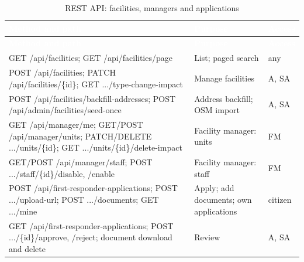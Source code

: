 {\tabfont\rowband
\begin{longtable}{@{}>{\raggedright\arraybackslash}p{}>{\raggedright\arraybackslash}p{}>{\raggedright\arraybackslash}p{}@{}}
\caption{REST API: facilities, managers and applications}\label{tab:api-5}\\
\rowcolor{najdanavy}\textcolor{white}{\sffamily\bfseries\small Method and path} & \textcolor{white}{\sffamily\bfseries\small Purpose} & \textcolor{white}{\sffamily\bfseries\small Access}\\
\endfirsthead
\rowcolor{najdanavy}\textcolor{white}{\sffamily\bfseries\small Method and path} & \textcolor{white}{\sffamily\bfseries\small Purpose} & \textcolor{white}{\sffamily\bfseries\small Access}\\
\endhead
\bottomrule\endlastfoot
GET /\allowbreak{}api/\allowbreak{}facilities; GET /\allowbreak{}api/\allowbreak{}facilities/\allowbreak{}page & List; paged search & any\\
POST /\allowbreak{}api/\allowbreak{}facilities; PATCH /\allowbreak{}api/\allowbreak{}facilities/\allowbreak{}\{id\}; GET .../\allowbreak{}type-change-impact & Manage facilities & A, SA\\
POST /\allowbreak{}api/\allowbreak{}facilities/\allowbreak{}backfill-addresses; POST /\allowbreak{}api/\allowbreak{}admin/\allowbreak{}facilities/\allowbreak{}seed-once & Address backfill; OSM import & A, SA\\
GET /\allowbreak{}api/\allowbreak{}manager/\allowbreak{}me; GET/\allowbreak{}POST /\allowbreak{}api/\allowbreak{}manager/\allowbreak{}units; PATCH/\allowbreak{}DELETE .../\allowbreak{}units/\allowbreak{}\{id\}; GET .../\allowbreak{}units/\allowbreak{}\{id\}/\allowbreak{}delete-impact & Facility manager: units & FM\\
GET/\allowbreak{}POST /\allowbreak{}api/\allowbreak{}manager/\allowbreak{}staff; POST .../\allowbreak{}staff/\allowbreak{}\{id\}/\allowbreak{}disable, /\allowbreak{}enable & Facility manager: staff & FM\\
POST /\allowbreak{}api/\allowbreak{}first-responder-applications; POST .../\allowbreak{}upload-url; POST .../\allowbreak{}documents; GET .../\allowbreak{}mine & Apply; add documents; own applications & citizen\\
GET /\allowbreak{}api/\allowbreak{}first-responder-applications; POST .../\allowbreak{}\{id\}/\allowbreak{}approve, /\allowbreak{}reject; document download and delete & Review & A, SA\\
\end{longtable}}
